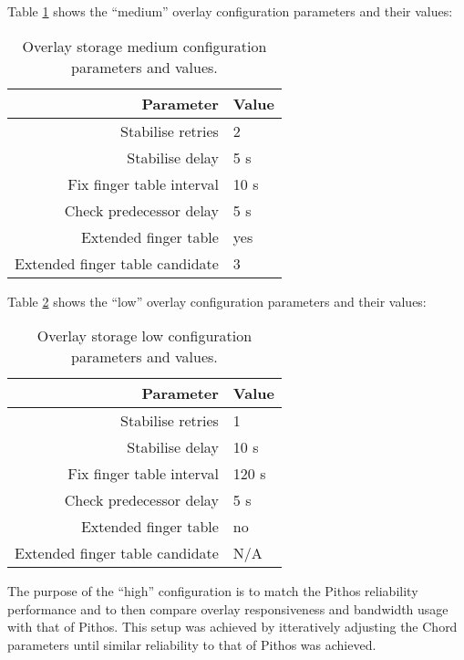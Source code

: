 Table \ref{tab_overlay_medium} shows the ``medium'' overlay configuration parameters and their values:
%
\begin{table}[htbp]
\centering
\begin{tabular}{|r|l|}
\hline
Parameter & Value\\
\hline
Stabilise retries               & 2\\
Stabilise delay                 & 5 s\\
Fix finger table interval       & 10 s\\
Check predecessor delay         & 5 s\\
Extended finger table           & yes\\
Extended finger table candidate & 3\\
\hline
\end{tabular}
\caption{Overlay storage medium configuration parameters and values.}
\label{tab_overlay_medium}
\end{table}

Table \ref{tab_overlay_low} shows the ``low'' overlay configuration parameters and their values:
%
\begin{table}[htbp]
\centering
\begin{tabular}{|r|l|}
\hline
Parameter & Value\\
\hline
Stabilise retries               & 1\\
Stabilise delay                 & 10 s\\
Fix finger table interval       & 120 s\\
Check predecessor delay         & 5 s\\
Extended finger table           & no\\
Extended finger table candidate & N/A\\
\hline
\end{tabular}
\caption{Overlay storage low configuration parameters and values.}
\label{tab_overlay_low}
\end{table}

The purpose of the ``high'' configuration is to match the Pithos reliability performance and to then compare overlay responsiveness and bandwidth usage with that of Pithos. This setup was achieved by itteratively adjusting the Chord parameters until similar reliability to that of Pithos was achieved.

